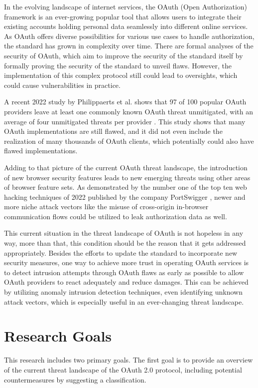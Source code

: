 
In the evolving landscape of internet services, the OAuth (Open Authorization) framework is an ever-growing popular tool that allows users to integrate their existing accounts holding personal data seamlessly into different online services. As OAuth offers diverse possibilities for various use cases to handle authorization, the standard has grown in complexity over time. There are formal analyses of the security of OAuth, which aim to improve the security of the standard itself \cite{fett2016comprehensive} by formally proving the security of the standard to unveil flaws. However, the implementation of this complex protocol still could lead to oversights, which could cause vulnerabilities in practice.

A recent 2022 study by Philippaerts et al. shows that 97 of 100 popular OAuth providers leave at least one commonly known OAuth threat unmitigated, with an average of four unmitigated threats per provider \cite{philippaerts2022oauch}. This study shows that many OAuth implementations are still flawed, and it did not even include the realization of many thousands of OAuth clients, which potentially could also have flawed implementations. 

Adding to that picture of the current OAuth threat landscape, the introduction of new browser security features leads to new emerging threats using other areas of browser feature sets. As demonstrated by the number one of the top ten web hacking techniques of 2022 published by the company PortSwigger \cite{kettle2022}, newer and more niche attack vectors like the misuse of cross-origin in-browser communication flows could be utilized to leak authorization data as well.

This current situation in the threat landscape of OAuth is not hopeless in any way, more than that, this condition should be the reason that it gets addressed appropriately. Besides the efforts to update the standard to incorporate new security measures, one way to achieve more trust in operating OAuth services is to detect intrusion attempts through OAuth flaws as early as possible to allow OAuth providers to react adequately and reduce damages. This can be achieved by utilizing anomaly intrusion detection techniques, even identifying unknown attack vectors, which is especially useful in an ever-changing threat landscape.


\section{Research Goals}
This research includes two primary goals. The first goal is to provide an overview of the current threat landscape of the OAuth 2.0 protocol, including potential countermeasures by suggesting a classification. 


